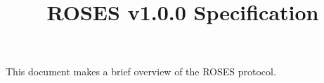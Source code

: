 \documentclass{article}
\title{ROSES v1.0.0 Specification}
\begin{document}
This document makes a brief overview of the ROSES protocol. 


\maketitle
\end{document}
